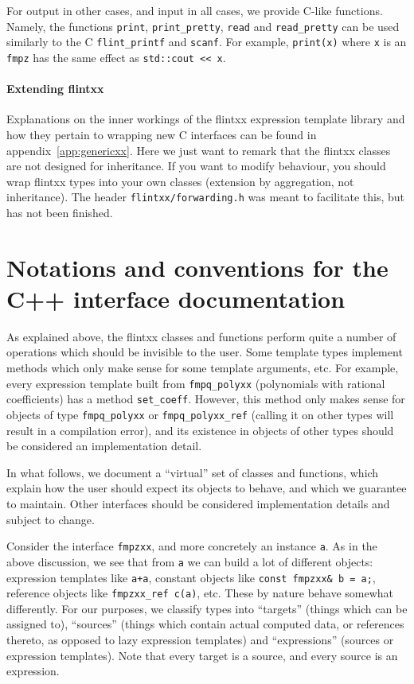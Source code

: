 \documentclass[a4paper,10pt]{book}
\newcommand{\code}{\lstinline}
\begin{document}
{{For output in other cases, and input in all cases, we provide C-like functions.
Namely, the functions \code{print}, \code{print_pretty}, \code{read} and
\code{read_pretty} can be used similarly to the C \code{flint_printf} and \code{scanf}.
For example, \code{print(x)} where \code{x} is an \code{fmpz} has the same
effect as \code{std::cout << x}.

\paragraph{Extending flintxx}

Explanations on the inner workings of the flintxx expression template library
and how they pertain to wrapping new C interfaces can be found in
appendix~\ref{app:genericxx}. Here we just want to remark that the flintxx
classes are not designed for inheritance. If you want to modify behaviour, you
should wrap flintxx types into your own classes (extension by aggregation, not
inheritance). The header \code{flintxx/forwarding.h} was meant to facilitate
this, but has not been finished.

\section{Notations and conventions for the C++ interface documentation}
As explained above, the flintxx classes and functions perform quite a number of
operations which should be invisible to the user. Some template types implement
methods which only make sense for some template arguments, etc. For example,
every expression template built from \code{fmpq_polyxx} (polynomials with
rational coefficients) has a method \code{set_coeff}. However, this method only
makes sense for objects of type \code{fmpq_polyxx} or \code{fmpq_polyxx_ref}
(calling it on other types will result in a compilation error),
and its existence in objects of other types should be considered an
implementation detail.

In what follows,
we document a ``virtual'' set of classes and functions, which explain how the
user should expect its objects to behave, and which we guarantee to maintain.
Other interfaces should be considered implementation details and subject to
change.

Consider the interface \code{fmpzxx}, and more concretely an instance \code{a}.
As in the above discussion, we see that from \code{a} we can build a lot of
different objects: expression templates like \code{a+a}, constant objects like
\code{const fmpzxx& b = a;}, reference objects like \code{fmpzxx_ref c(a)}, etc.
These by nature behave somewhat differently. For our purposes, we classify types
into ``targets'' (things which can be assigned to), ``sources'' (things which
contain actual computed data, or references thereto,
as opposed to lazy expression templates) and
``expressions'' (sources or expression templates). Note that every target is a
source, and every source is an expression.

}}
\end{document}
